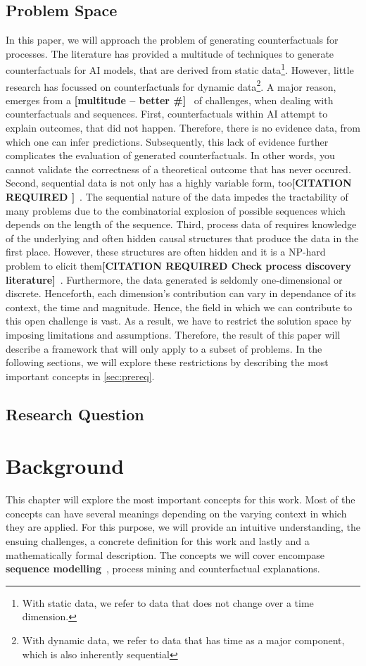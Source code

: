 \documentclass[12pt,a4paper,footinclude=true,headinclude=true]{report}
\newcommand{\attention}[1]{\color{red}\textbf{[#1]}\color{black}~}
\newcommand{\needscite}[1]{\color{red}\textbf{[CITATION REQUIRED #1]}\color{black}~}
\newcommand{\optional}[1]{\color{blue}\textbf{#1}\color{black}~}
\begin{document}
\section{Problem Space}
In this paper, we will approach the problem of generating counterfactuals for processes. The literature has provided a multitude of techniques to generate counterfactuals for AI models, that are derived from static data\footnote{With static data, we refer to data that does not change over a time dimension.}. However, little research has focussed on counterfactuals for dynamic data\footnote{With dynamic data, we refer to data that has time as a major component, which is also inherently sequential}. A major reason, emerges from a \attention{multitude -- better \#} of challenges, when dealing with counterfactuals and sequences. 
First, counterfactuals within AI attempt to explain outcomes, that did not happen. Therefore, there is no evidence data, from which one can infer predictions. Subsequently, this lack of evidence further complicates the evaluation of generated counterfactuals. In other words, you cannot validate the correctness of a theoretical outcome that has never occured. 
Second, sequential data is not only has a highly variable form, too\needscite{}. The sequential nature of the data impedes the tractability of many problems due to the combinatorial explosion of possible sequences which depends on the length of the sequence. 
Third, process data of requires knowledge of the underlying and often hidden causal structures that produce the data in the first place. However, these structures are often hidden and it is a NP-hard problem to elicit them\needscite{Check process discovery literature}. Furthermore, the data generated is seldomly one-dimensional or discrete. Henceforth, each dimension's contribution can vary in dependance of its context, the time and magnitude.  
Hence, the field in which we can contribute to this open challenge is vast. As a result, we have to restrict the solution space by imposing limitations and assumptions. Therefore, the result of this paper will describe a framework that will only apply to a subset of problems. In the following sections, we will explore these restrictions by describing the most important concepts in \autoref{sec:prereq}.
\section{Research Question}

\chapter{Background}
\label{sec:prereq}
This chapter will explore the most important concepts for this work. Most of the concepts can have several meanings depending on the varying context in which they are applied. For this purpose, we will provide an intuitive understanding, the ensuing challenges, a concrete definition for this work and lastly and a mathematically formal description. The concepts we will cover encompase \optional{sequence modelling}, process mining and counterfactual explanations.  
\end{document}
